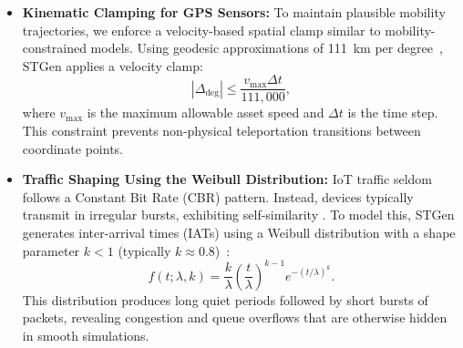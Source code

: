 \documentclass[jsan,article,submit,moreauthors,pdftex]{Definitions/mdpi}
\begin{document}
\begin{itemize}
    \item \textbf{Kinematic Clamping for GPS Sensors:}           
    To maintain plausible mobility trajectories, we enforce a velocity-based spatial clamp similar to mobility-constrained models. Using geodesic approximations of 111~km per degree~\cite{snyder1987map}, STGen applies a velocity clamp:
    \begin{equation}
    |\Delta_{\text{deg}}| \le \frac{v_{\max} \Delta t}{111{,}000},
    \end{equation}
    where $v_{\max}$ is the maximum allowable asset speed and $\Delta t$ is the time step. This constraint prevents non-physical teleportation transitions between coordinate points.

    \item \textbf{Traffic Shaping Using the Weibull Distribution:}           
    {IoT} traffic seldom follows a Constant Bit Rate (CBR) pattern. Instead, devices typically transmit in irregular bursts, exhibiting self-similarity \cite{leland1994nature}. To model this, STGen generates inter-arrival times (IATs) using a Weibull distribution with a shape parameter $k < 1$ (typically $k \approx 0.8$)~\cite{6662948}:
    \begin{equation}
    f(t; \lambda, k) = \frac{k}{\lambda}\left(\frac{t}{\lambda}\right)^{k-1} e^{-(t/\lambda)^k}.
    \end{equation}
    This distribution produces long quiet periods followed by short bursts of packets, revealing congestion and queue overflows that are otherwise hidden in smooth simulations.
\end{itemize}
\end{document}
